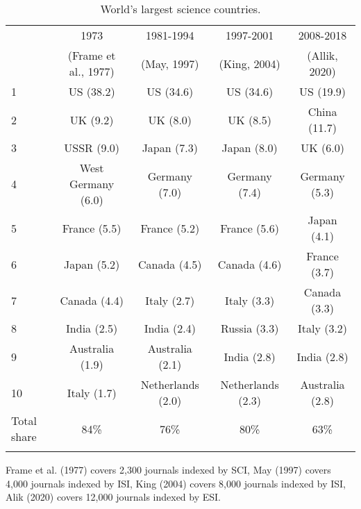 \begin{table}
	\begin{threeparttable}
	\caption{World's largest science countries.}
	\label{tab:WorldScienceOutput}       %
		\begin{tabular}{lcccc}
\hline\noalign{\smallskip}
 & 1973 & 1981-1994 & 1997-2001 & 2008-2018 \\
 & (Frame et al., 1977) & (May, 1997) & (King, 2004) & (Allik, 2020) \\ 
\noalign{\smallskip}\hline\noalign{\smallskip}
1 & US (38.2) & US (34.6) & US (34.6) & US (19.9) \\
2 & UK (9.2) & UK (8.0)	 & UK (8.5) & China (11.7) \\
3 & USSR (9.0) & Japan	(7.3) & Japan (8.0) & UK (6.0) \\
4 & West Germany	(6.0)	& Germany (7.0) & Germany (7.4) & Germany (5.3) \\
5 & France (5.5) & France (5.2) & France (5.6) & Japan (4.1) \\
6 & Japan (5.2) & Canada (4.5) & Canada (4.6) & France (3.7) \\
7 & Canada (4.4) & Italy	(2.7) & Italy (3.3) & Canada (3.3) \\
8 & India (2.5)	& India (2.4) & Russia (3.3) & Italy (3.2) \\
9 & Australia (1.9) & Australia	(2.1) & India (2.8) & India (2.8) \\
10 & Italy (1.7) & Netherlands (2.0) & Netherlands (2.3) & Australia (2.8) \\
\noalign{\smallskip}\hline\noalign{\smallskip}
Total share & 84\% & 76\% & 80\% & 63\% \\
\noalign{\smallskip}\hline
		\end{tabular}
		\begin{tablenotes}
			\small
			\item Frame et al. (1977) covers 2,300 journals indexed by SCI, May (1997) covers 4,000 journals indexed by ISI, King (2004) covers 8,000 journals indexed by ISI, Alik (2020) covers 12,000 journals indexed by ESI.
		\end{tablenotes}
	\end{threeparttable}
\end{table}